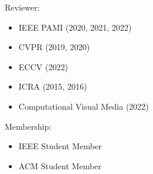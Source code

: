 
\begin{cvparagraph}
Reviewer:
\begin{itemize}
	\item IEEE PAMI (2020, 2021, 2022)
	\item CVPR (2019, 2020)
	\item ECCV (2022)
	\item ICRA (2015, 2016)
	\item Computational Visual Media (2022)
\end{itemize}
Membership:
\begin{itemize}
	\item IEEE Student Member
	\item ACM Student Member
\end{itemize}
\end{cvparagraph}
